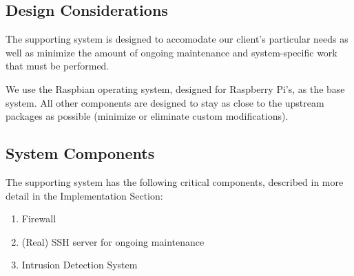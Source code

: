 \subsection{Design Considerations}

The supporting system is designed to accomodate our client's particular needs
as well as minimize the amount of ongoing maintenance and system-specific work
that must be performed.

We use the Raspbian operating system, designed for Raspberry Pi's, as the base
system. All other components are designed to stay as close to the upstream
packages as possible (minimize or eliminate custom modifications).

\subsection{System Components}

The supporting system has the following critical components, described in more
detail in the Implementation Section:
\begin{enumerate}
    \item Firewall
    \item (Real) SSH server for ongoing maintenance
    \item Intrusion Detection System
\end{enumerate}
